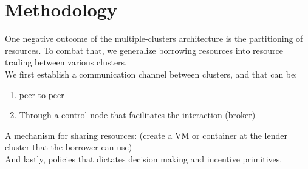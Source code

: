 \section{Methodology}
One negative outcome of the multiple-clusters architecture is the partitioning of resources. 
To combat that, we generalize borrowing resources into resource trading between various clusters. 
\\ We first establish a communication channel between clusters, and that can be:
\\ \begin{enumerate}
    \item peer-to-peer
    \item Through a control node that facilitates the interaction (broker)
\end{enumerate}
A mechanism for sharing resources: (create a VM or container at the lender cluster that the borrower can use)
\\ And lastly, policies that dictates decision making and incentive primitives. %





